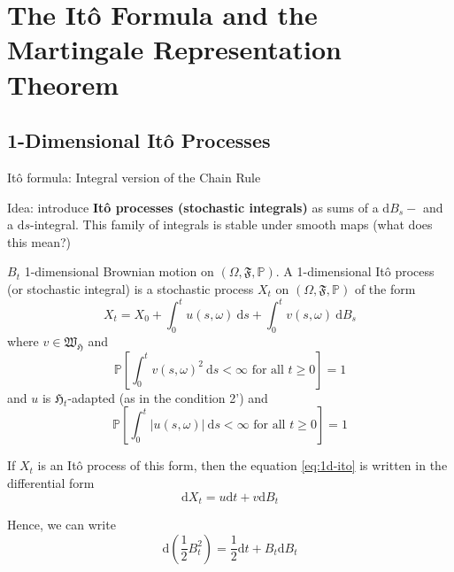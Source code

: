 \chapter{The Itô Formula and the Martingale Representation Theorem}

\section{1-Dimensional Itô Processes}

Itô formula: Integral version of the Chain Rule

Idea: introduce \textbf{Itô processes (stochastic integrals)} as sums of a  $\mathrm{d}B_s-$ and a $\mathrm{d}s$-integral. This family of integrals is stable under smooth maps (what does this mean?)

\begin{definition}\label{def:ito-process}
    $B_t$ 1-dimensional Brownian motion on $(\Omega, \mathfrak{F}, \mathbb{P})$. A 1-dimensional Itô process (or stochastic integral) is a stochastic process $X_t$ on $(\Omega, \mathfrak{F}, \mathbb{P})$ of the form 
    \begin{equation}\label{eq:1d-ito}
        X_t = X_0 + \int_0^t u(s, \omega) ~\mathrm{d}s + \int_0^t v(s, \omega) ~\mathrm{d}B_s
    \end{equation}
    where $v \in \mathfrak{W}_\mathfrak{H}$ and
    \begin{equation*}
        \mathbb{P} \left[ \int_0^t v(s,\omega)^2 ~\mathrm{d}s < \infty \text{ for all } t \geq 0 \right] = 1
    \end{equation*}
    and $u$ is $\mathfrak{H}_t$-adapted (as in the condition 2') and 
    \begin{equation*}
        \mathbb{P} \left[ \int_0^t |u(s,\omega)| ~\mathrm{d}s < \infty \text{ for all } t \geq 0 \right] = 1
    \end{equation*}
\end{definition}

If $X_t$ is an Itô process of this form, then the equation \eqref{eq:1d-ito} is written in the differential form
\begin{equation*}
    \mathrm{d}X_t = u \mathrm{d}t + v \mathrm{d}B_t
\end{equation*}

Hence, we can write
\begin{equation*}
    \mathrm{d}\left( \frac{1}{2} B_t^2 \right) = \frac{1}{2} \mathrm{d}t + B_t \mathrm{d}B_t
\end{equation*}

